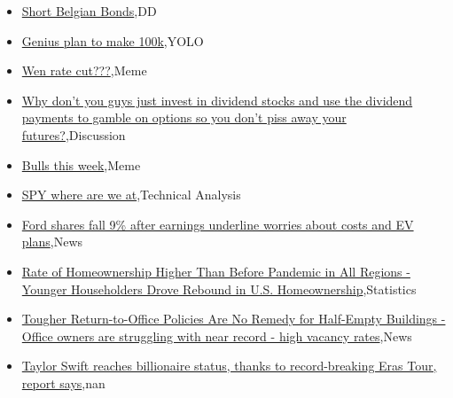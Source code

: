 \documentclass{article}%
\begin{document}
%
\begin{itemize}%
\item%
\href{https://reddit.com/r/wallstreetbets/comments/17ibvyw/short\_belgian\_bonds/}{Short Belgian Bonds},DD%
\item%
\href{https://reddit.com/r/wallstreetbets/comments/17i89mt/genius\_plan\_to\_make\_100k/}{Genius plan to make 100k},YOLO%
\item%
\href{https://reddit.com/r/wallstreetbets/comments/17i74o8/wen\_rate\_cut/}{Wen rate cut???},Meme%
\item%
\href{https://reddit.com/r/wallstreetbets/comments/17i5ml9/why\_dont\_you\_guys\_just\_invest\_in\_dividend\_stocks/}{Why don't you guys just invest in dividend stocks and use the dividend payments to gamble on options so you don't piss away your futures?},Discussion%
\item%
\href{https://reddit.com/r/wallstreetbets/comments/17i58rd/bulls\_this\_week/}{Bulls this week},Meme%
\item%
\href{https://reddit.com/r/StockMarket/comments/17hu7ex/spy\_where\_are\_we\_at/}{SPY where are we at},Technical Analysis%
\item%
\href{https://reddit.com/r/StockMarket/comments/17hptl4/ford\_shares\_fall\_9\_after\_earnings\_underline/}{Ford shares fall 9\% after earnings underline worries about costs and EV plans},News%
\item%
\href{https://reddit.com/r/Economics/comments/17i39ug/rate\_of\_homeownership\_higher\_than\_before\_pandemic/}{Rate of Homeownership Higher Than Before Pandemic in All Regions - Younger Householders Drove Rebound in U.S. Homeownership},Statistics%
\item%
\href{https://reddit.com/r/Economics/comments/17hypng/tougher\_returntooffice\_policies\_are\_no\_remedy\_for/}{Tougher Return-to-Office Policies Are No Remedy for Half-Empty Buildings - Office owners are struggling with near record - high vacancy rates},News%
\item%
\href{https://reddit.com/r/Economics/comments/17htnpt/taylor\_swift\_reaches\_billionaire\_status\_thanks\_to/}{Taylor Swift reaches billionaire status, thanks to record-breaking Eras Tour, report says},nan%
\end{itemize}%
\end{document}
